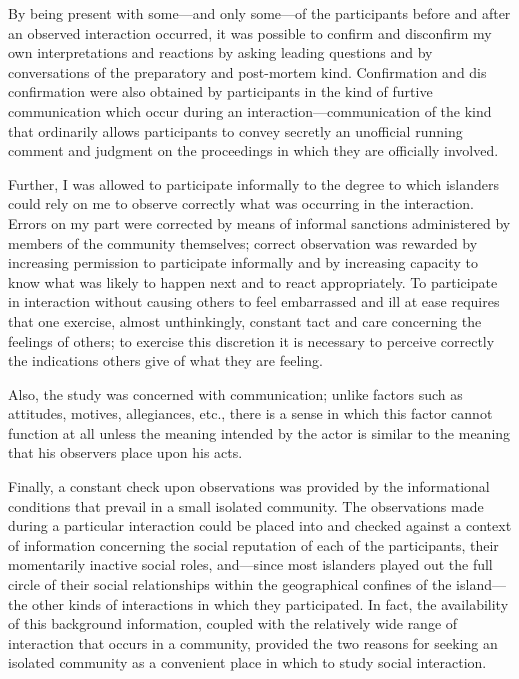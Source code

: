 \documentclass[openany,nobib]{tufte-book}
\begin{document}
By being present with some---and only some---of the participants before
and after an observed interaction occurred, it was possible to confirm
and disconfirm my own interpretations and reactions by asking leading
questions and by conversations of the preparatory and post-mortem kind.
Confirmation and dis confirmation were also obtained by participants in
the kind of furtive communication which occur during an
interaction---communication of the kind that ordinarily allows
participants to convey secretly an unofficial running comment and
judgment on the proceedings in which they are officially involved.

Further, I was allowed to participate informally to the degree to which
islanders could rely on me to observe correctly what was occurring in
the interaction. Errors on my part were corrected by means of informal
sanctions administered by members of the community themselves; correct
observation was rewarded by increasing permission to participate
informally and by increasing capacity to know what was likely to happen
next and to react appropriately. To participate in interaction without
causing others to feel embarrassed and ill at ease requires that one
exercise, almost unthinkingly, constant tact and care concerning the
feelings of others; to exercise this discretion it is necessary to
perceive correctly the indications others give of what they are feeling.

Also, the study was concerned with communication; unlike factors such as
attitudes, motives, allegiances, etc., there is a sense in which this
factor cannot function at all unless the meaning intended by the actor
is similar to the meaning that his observers place upon his acts.

Finally, a constant check upon observations was provided by the
informational conditions that prevail in a small isolated community. The
observations made during a particular interaction could be placed into
and checked against a context of information concerning the social
reputation of each of the participants, their momentarily inactive
social roles, and---since most islanders played out the full circle of
their social relationships within the geographical confines of the
island---the other kinds of interactions in which they participated. In
fact, the availability of this background information, coupled with the
relatively wide range of interaction that occurs in a community,
provided the two reasons for seeking an isolated community as a
convenient place in which to study social interaction.
\end{document}
